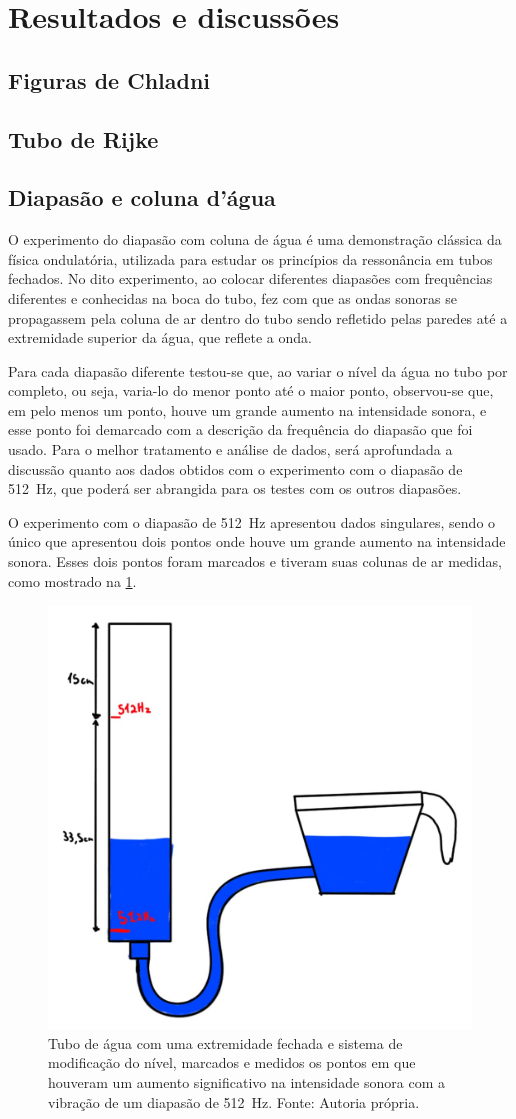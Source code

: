 \section{Resultados e discussões}
\subsection{Figuras de Chladni}

\subsection{Tubo de Rijke}

\subsection{Diapasão e coluna d'água}
O experimento do diapasão com coluna de água é uma demonstração clássica da física ondulatória, utilizada para estudar os princípios da ressonância em tubos fechados. No dito experimento, ao colocar diferentes diapasões com frequências diferentes e conhecidas na boca do tubo, fez com que as ondas sonoras se propagassem pela coluna de ar dentro do tubo sendo refletido pelas paredes até a extremidade superior da água, que reflete a onda. 

Para cada diapasão diferente testou-se que, ao variar o nível da água no tubo por completo, ou seja, varia-lo do menor ponto até o maior ponto, observou-se que, em pelo menos um ponto, houve um grande aumento na intensidade sonora, e esse ponto foi demarcado com a descrição da frequência do diapasão que foi usado. Para o melhor tratamento e análise de dados, será aprofundada a discussão quanto aos dados obtidos com o experimento com o diapasão de \qty{512}{Hz}, que poderá ser abrangida para os testes com os outros diapasões.

O experimento com o diapasão de \qty{512}{Hz} apresentou dados singulares, sendo o único que apresentou dois pontos onde houve um grande aumento na intensidade sonora.  Esses dois pontos foram marcados e tiveram suas colunas de ar medidas, como mostrado na \cref{TuboFechado}.
\begin{figure}[H]
	\centering
	\includegraphics[width=0.35\linewidth]{fig/TuboFechado.png}
	\caption{Tubo de água com uma extremidade fechada e sistema de modificação do nível, marcados e medidos os pontos em que houveram um aumento significativo na intensidade sonora com a vibração de um diapasão de \qty{512}{Hz}. Fonte: Autoria própria.}
	\label{TuboFechado}
\end{figure}

